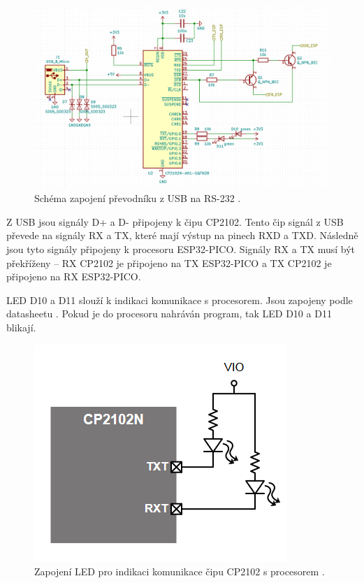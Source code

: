 \begin{figure}[!h]
    \begin{center}
      \includegraphics[scale=0.6]{obrazky/CP2102_schema.png}
    \end{center}
    \caption[Schéma zapojení převodníku z USB na RS-232]{Schéma zapojení převodníku z USB na RS-232 \cite{Devkit_schema}.}
\end{figure}

Z USB jsou signály D+ a D- připojeny k čipu CP2102. Tento čip signál z USB převede na signály RX a TX, které mají výstup 
na pinech RXD a TXD. Následně jsou tyto signály připojeny k procesoru ESP32-PICO. Signály RX a TX musí být překříženy – RX 
CP2102 je připojeno na TX ESP32-PICO a TX CP2102 je připojeno na RX ESP32-PICO. 

LED D10 a D11 slouží k indikaci komunikace s procesorem. Jsou zapojeny podle datasheetu \cite{CP2102_datasheet}. Pokud je do 
procesoru nahráván program, tak LED D10 a D11 blikají.

\begin{figure}[!h]
    \begin{center}
      \includegraphics[scale=1]{obrazky/CP2102_LED.png}
    \end{center}
    \caption[Zapojení LED pro indikaci komunikace čipu CP2102 s procesorem]{Zapojení LED pro indikaci komunikace čipu CP2102 s procesorem \cite{CP2102_datasheet}.}
\end{figure}

